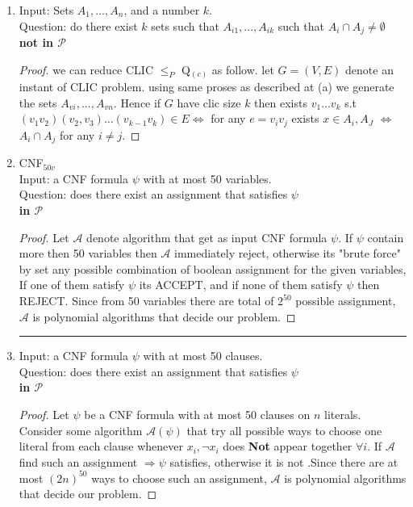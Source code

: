 \documentclass[12pt]{article}
\begin{document}
\begin{enumerate}[label=(\alph*)]
\begin{proof}
\end{proof}
Hence using same reduction described in (a) its holds that $3-$IND$\le_P3-$MDS.\\
\hrule
\item Input:  Sets $A_1, ..., A_n$, and a number $k$.\\ Question: do there exist $k$  sets such that $A_{i1} 
, ..., A_{ik}$ such that $A_i\cap A_j\neq \emptyset $\\
\textbf{ not in  $\mathcal{P}$}\begin{proof}
we can reduce CLIC $ \le_P$ Q$_{(c)}$ as follow. let $G=(V,E)$  denote an instant of CLIC problem. using same proses as described at (a) we generate the sets  $A_{vi}, ..., A_{vn}$. Hence if $G$ have clic size $k$ then exists $v_1\dots  v_k$ s.t $(v_1 v_2)(v_2,v_3)  \dots (v_{k-1} v_k)\in E \Leftrightarrow$ for any $e=v_iv_j$ exists $x\in A_i,A_J$  $\Leftrightarrow$   $A_i\cap A_j$ for any $i\ne j$.
\end{proof}
\pagebreak
\item  CNF$_{50v}$\\
Input: a CNF formula $\psi$ with at most 50 variables.
\\Question: does there exist an assignment that satisfies  $\psi$ 
\\\textbf{ in  $\mathcal{P}$}
 \begin{proof}  Let  $\mathcal{A}$ denote algorithm  that get as input  CNF formula $\psi$. If $\psi$ contain more then 50 variables then $\mathcal{A}$ immediately reject, otherwise its "brute force" by set  any possible combination of boolean assignment for the given variables, If one of them satisfy $\psi$ its ACCEPT, and if none of them satisfy  $\psi$  then REJECT. Since from 50 variables  there are  total of  $2^{50}$ possible assignment, $\mathcal{A}$  is polynomial   algorithms that decide our problem.\end{proof}
\hrule 
\item Input: a CNF formula $\psi$ with at most 50 clauses.
\\Question: does there exist an assignment that satisfies  $\psi$ 
\\ \textbf{ in  $\mathcal{P}$}
\begin{proof}
Let $\psi$ be  a CNF formula with at most 50 clauses on $n$ literals. Consider some algorithm $\mathcal{A}(\psi)$ that  try all possible ways to choose one  literal from each clause whenever  $x_i,\neg x_i $ does \textbf{Not} appear together $\forall i$. If $\mathcal{A}$ find such an assignment $\Rightarrow\psi$ satisfies, otherwise it is not .Since there are at most $(2n)^{50}$ ways to choose such an assignment, $\mathcal{A}$ is polynomial   algorithms that decide our problem.

\end{proof}
\end{enumerate}
\end{document}

